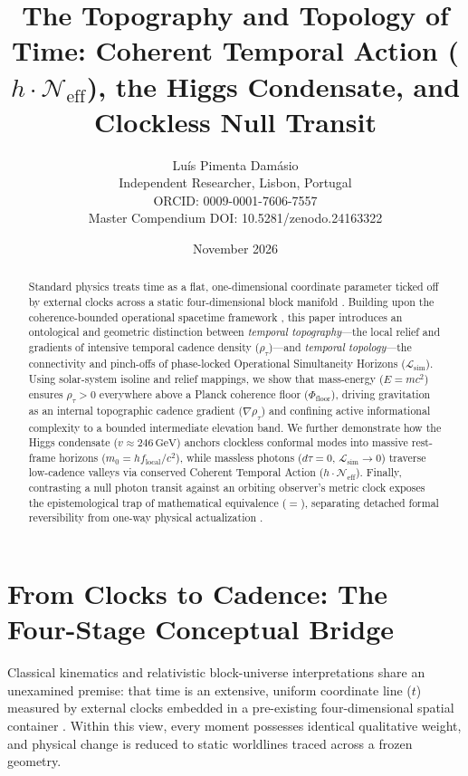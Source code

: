 \documentclass[11pt,a4paper]{article}
\title{\textbf{The Topography and Topology of Time: Coherent Temporal Action ($h \cdot \mathcal{N}_{\mathrm{eff}}$), the Higgs Condensate, and Clockless Null Transit}}
\author{Lu\'is Pimenta Dam\'asio \\ \small Independent Researcher, Lisbon, Portugal \\ \small ORCID: 0009-0001-7606-7557 \\ \small Master Compendium DOI: 10.5281/zenodo.24163322}
\date{November 2026}
\theoremstyle{remark}
\begin{document}
\maketitle

\begin{abstract}
Standard physics treats time as a flat, one-dimensional coordinate parameter ticked off by external clocks across a static four-dimensional block manifold \cite{einstein1905,einstein1916}. Building upon the coherence-bounded operational spacetime framework \cite{damasio_p15,damasio_p16,damasio_p17}, this paper introduces an ontological and geometric distinction between \emph{temporal topography}---the local relief and gradients of intensive temporal cadence density ($\rho_\tau$)---and \emph{temporal topology}---the connectivity and pinch-offs of phase-locked Operational Simultaneity Horizons ($\mathcal{L}_{\mathrm{sim}}$). Using solar-system isoline and relief mappings, we show that mass-energy ($E = mc^2$) ensures $\rho_\tau > 0$ everywhere above a Planck coherence floor ($\Phi_{\mathrm{floor}}$), driving gravitation as an internal topographic cadence gradient ($\nabla \rho_\tau$) and confining active informational complexity to a bounded intermediate elevation band. We further demonstrate how the Higgs condensate ($v \approx 246\,\mathrm{GeV}$) \cite{higgs1964,englert1964} anchors clockless conformal modes into massive rest-frame horizons ($m_0 = h f_{\mathrm{local}}/c^2$), while massless photons ($d\tau = 0$, $\mathcal{L}_{\mathrm{sim}} \to 0$) traverse low-cadence valleys via conserved Coherent Temporal Action ($h \cdot \mathcal{N}_{\mathrm{eff}}$). Finally, contrasting a null photon transit against an orbiting observer's metric clock exposes the epistemological trap of mathematical equivalence ($=$), separating detached formal reversibility from one-way physical actualization \cite{frege1918}.
\end{abstract}

\section{From Clocks to Cadence: The Four-Stage Conceptual Bridge}

Classical kinematics and relativistic block-universe interpretations share an unexamined premise: that time is an extensive, uniform coordinate line ($t$) measured by external clocks embedded in a pre-existing four-dimensional spatial container \cite{einstein1905}. Within this view, every moment possesses identical qualitative weight, and physical change is reduced to static worldlines traced across a frozen geometry.
\end{document}
